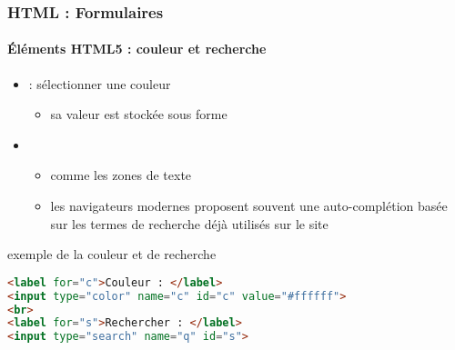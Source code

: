 \documentclass[xcolor=table]{beamer}
\begin{document}
\begin{frame}[fragile]
\frametitle{HTML : Formulaires}
\framesubtitle{Éléments HTML5 : couleur et recherche}

\begin{itemize}
	\item {} : sélectionner une couleur
	\begin{itemize}
		\item sa valeur est stockée sous forme 
	\end{itemize}
	\item {}
	\begin{itemize}
		\item comme les zones de texte
		\item les navigateurs modernes proposent souvent une auto-complétion basée sur les termes de recherche déjà utilisés sur le site
	\end{itemize}
\end{itemize}

\begin{exampleblock}{exemple de la couleur et de recherche}
\lstset{escapeinside=**}
\scriptsize\bfseries\vspace{-6pt}
\begin{lstlisting}[language={html}]
<label for="c">Couleur : </label>
<input type="color" name="c" id="c" value="#ffffff">
<br>
<label for="s">Rechercher : </label>
<input type="search" name="q" id="s">

\end{lstlisting}\vspace{-6pt}
\end{exampleblock}

\end{frame}
\end{document}
